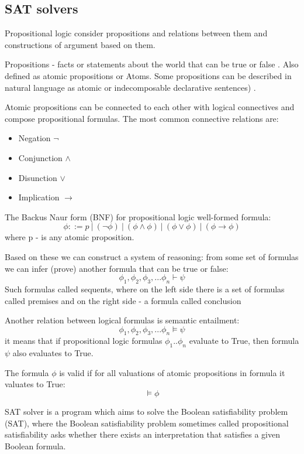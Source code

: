 \subsection {SAT solvers}

Propositional logic consider  propositions and relations between them and 
constructions of argument based on them.

Propositions - facts or statements about the world  that can be true or false
. Also defined as atomic propositions or Atoms.
Some propositions can be described in natural language as atomic or indecomposable 
declarative sentences) \cite{HuthR1}.


Atomic propositions can be connected to each other with logical connectives and compose propositional formulas.
The most common connective relations are:
\begin{itemize}
    \item Negation $ \neg $
    \item Conjunction $ \land $ 
    \item Disunction $ \lor $ 
    \item Implication $ \rightarrow $
\end{itemize}

The Backus Naur form (BNF) for propositional logic well-formed formula:
\[ \phi ::= p\ |\ (\neg \phi)\ |\ (\phi \land \phi)\ |\ (\phi\lor\phi)\ |\ (\phi\rightarrow\phi)    \]
where p - is any atomic proposition.

Based on these we can construct a system of reasoning: from some set of formulas we can infer (prove) another formula that can be true or false:
\[ \phi_1, \phi_2, \phi_3, ... \phi_n \vdash \psi \]
Such formulas called sequents, where on the left side there is a set of formulas called premises and on the right side - a formula called conclusion


Another relation between logical formulas  is semantic entailment:
\[ \phi_1, \phi_2, \phi_3, ... \phi_n \models \psi \]
it means that if propositional logic formulas $\phi_1 .. \phi_n$ evaluate to True, then formula $\psi$ also evaluates to True.

The formula $\phi$ is valid if for all valuations of atomic propositions in formula it valuates to True:
\[ \models \phi \]


SAT solver is a program which aims to solve the Boolean satisfiability problem 
(SAT), where the Boolean satisfiability problem sometimes called 
propositional satisfiability asks whether there 
exists an interpretation that satisfies a given Boolean formula. 

